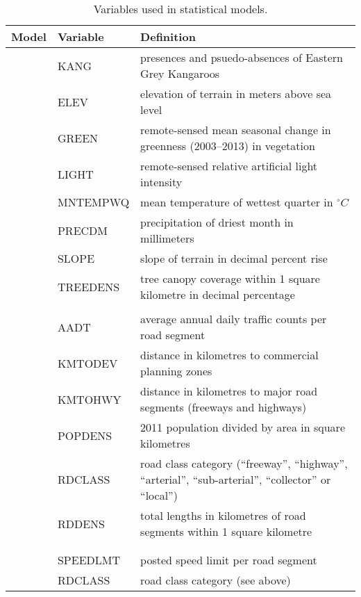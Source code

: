 \begin{table}[htp]
\caption[Variables used in statistical models]{Variables used in statistical models.}
\centering
\begin{tabularx}{0.9\textwidth}{llY} \toprule
Model &Variable    &Definition\\ \midrule 
{}   &KANG        &presences and psuedo-absences of Eastern Grey Kangaroos\\
           		 &ELEV        &elevation of terrain in meters above sea level\\
           		 &GREEN       &remote-sensed mean seasonal change in greenness (2003--2013) in vegetation\\
           		 &LIGHT       &remote-sensed relative artificial light intensity\\
           		 &MNTEMPWQ    &mean temperature of wettest quarter in $^{\circ}C$\\
           		 &PRECDM      &precipitation of driest month in millimeters\\
           		 &SLOPE       &slope of terrain in decimal percent rise\\
           		 &TREEDENS    &tree canopy coverage within 1 square kilometre in decimal percentage\\
&&\\
   &AADT        &average annual daily traffic counts per road segment\\
           		 &KMTODEV     &distance in kilometres to commercial planning zones\\
           		 &KMTOHWY     &distance in kilometres to major road segments (freeways and highways)\\
           		 &POPDENS     &2011 population divided by area in square kilometres\\
           		 &RDCLASS     &road class category (``freeway'', ``highway'', ``arterial'', ``sub-arterial'', ``collector'' or ``local'')\\
           		 &RDDENS      &total lengths in kilometres of road segments within 1 square kilometre\\
&&\\
 &&\\
    			 &SPEEDLMT    &posted speed limit per road segment	\\
           		 &RDCLASS     &road class category (see above)\\

\end{tabularx}
\end{table}
